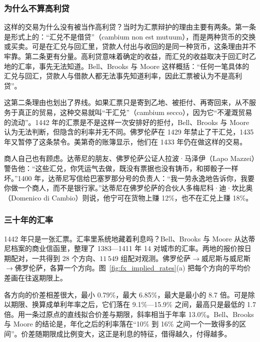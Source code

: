 \subsubsection{为什么不算高利贷}
这样的交易为什么没有被当作高利贷？当时为汇票辩护的理由主要有两条\cite{bell2017}。第一条是形式上的：“汇兑不是借贷”（cambium non est mutuum），而是两种货币的交换或买卖。可是在汇兑与回汇里，贷款人付出与收回的是同一种货币，这条理由并不牢靠。第二条更有分量。高利贷意味着确定的收益，而汇兑的收益取决于回汇时乙地的汇率，事先无法知道。Bell、Brooks 与 Moore 这样概括：“任何一笔具体的汇兑与回汇，贷款人与借款人都无法事先知道利率，因此汇票被认为不是高利贷”。

这第二条理由也划出了界线。如果汇票只是寄到乙地、被拒付、再寄回来，从不服务于真正的贸易，这种交易就叫“干汇兑”（cambium secco），因为它“不灌溉贸易的流动”\cite{bell2017}。1442 年的汇票是不是这样一次安排好的拒付，Bell、Brooks 与 Moore 认为无法判断，但隐含的利率并无不同。佛罗伦萨在 1429 年禁止了干汇兑，1435 年又暂停了这条禁令\cite{bell2017}。美第奇的账簿显示，他们在 1433 年仍在做这样的交易。

商人自己也有顾虑。达蒂尼的朋友、佛罗伦萨公证人拉波·马泽伊（Lapo Mazzei）警告他：“这些汇兑，你凭运气去做，既没有票据也没有铸币，和掷骰子一样坏。”1400 年，达蒂尼写信给巴塞罗那分号的负责人：“我一劳永逸地告诉你，我要你做一个商人，而不是银行家。”达蒂尼在佛罗伦萨的合伙人多梅尼科·迪·坎比奥（Domenico di Cambio）则说，他宁可在货物上赚 12\%，也不在汇兑上赚 18\%\cite{bell2017}。

\subsubsection{三十年的汇率}
1442 年只是一张汇票。汇率里系统地藏着利息吗？Bell、Brooks 与 Moore 从达蒂尼档案的商业信函里，整理了 1383—1411 年 14 对城市的汇率。两地的报价按日期配对，一共得到 28 个方向、$11\,549$ 组配对观测\cite{bell2017}。佛罗伦萨$\to$威尼斯与威尼斯$\to$佛罗伦萨，各算一个方向。图~\ref{fig:fx_implied_rates}(a) 把每个方向的平均价差画在往返期限上。

各方向的价差相差很大，最小 0.79\%，最大 6.85\%，最大是最小的 8.7 倍。可是除以期限、换算成单利年率之后，它们落在 9.1\%—15.9\% 之间，最高只是最低的 1.7 倍。用一条过原点的直线拟合价差与期限，斜率相当于年率 13.0\%。Bell、Brooks 与 Moore 的结论是，年化之后的利率落在“10\% 到 16\% 之间一个一致得多的区间”\cite{bell2017}。价差随期限成比例变大，这正是利息的特征，借得越久，付得越多。



